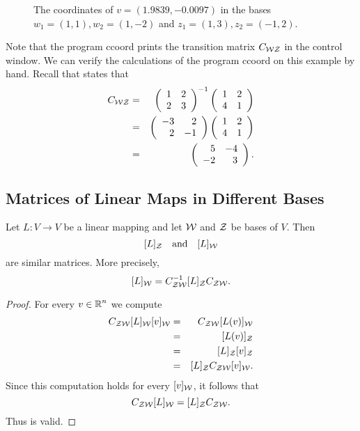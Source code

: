 \documentclass{ximera}
\begin{document}
\begin{figure*}[htb]
     \centerline{%
	}
     \caption{The coordinates of $v=(1.9839,-0.0097)$ in the bases
	$w_1=(1,1), w_2=(1,-2)$ and $z_1=(1,3),z_2=(-1,2)$.}
     \label{F:2coords}
\end{figure*}

Note that the program {\sf ccoord} prints the transition matrix
$C_{\cal WZ}$ in the \Matlab control window.  We can verify the
calculations of the program {\sf ccoord} on this example by hand.
Recall that  states that
\begin{eqnarray*}
C_{\cal WZ} & = & \left(\begin{array}{rr} 1 & 2\\ 2 &3\end{array}\right)^{-1}\left(\begin{array}{rr} 1 & 2\\ 4 &1\end{array}\right) \\
& = & \left(\begin{array}{rr} -3 & 2\\ 2 &-1\end{array}\right)\left(\begin{array}{rr} 1 & 2\\ 4 &1\end{array}\right) \\
& = & \left(\begin{array}{rr} 5 & -4\\ -2 &3\end{array}\right).
\end{eqnarray*}


\subsection*{Matrices of Linear Maps in Different Bases}

\begin{theorem} \label{T:matrixcoord}
Let $L:V\to V$ be a linear mapping and let
${\cal W}$ and ${\cal Z}$ be bases of $V$.  Then
\[
[L]_{\cal Z} \quad\mbox{and}\quad [L]_{\cal W}
\]
are similar  matrices.  More precisely,
\begin{equation}  \label{e:matrixcoord}
[L]_{\cal W} = C_{{\cal Z}{\cal W}}^{-1} [L]_{\cal Z} C_{{\cal Z}{\cal W}}.
\end{equation}
\end{theorem}

\begin{proof}  For every $v\in\mbox{$\Bbb{R}$}^n$ we compute
\begin{eqnarray*}
C_{{\cal Z}{\cal W}}[L]_{\cal W}[v]_{\cal W} & = &
C_{{\cal Z}{\cal W}}[L(v)]_{\cal W} \\
& = & [L(v)]_{\cal Z}  \\
& = & [L]_{\cal Z}[v]_{\cal Z} \\
& = & [L]_{\cal Z} C_{{\cal Z}{\cal W}}[v]_{\cal W}.
\end{eqnarray*}
Since this computation holds for every $[v]_{\cal W}$, it follows that
\[
C_{{\cal Z}{\cal W}}[L]_{\cal W} = [L]_{\cal Z} C_{{\cal Z}{\cal W}}.
\]
Thus  is valid.  \end{proof}
\end{document}

